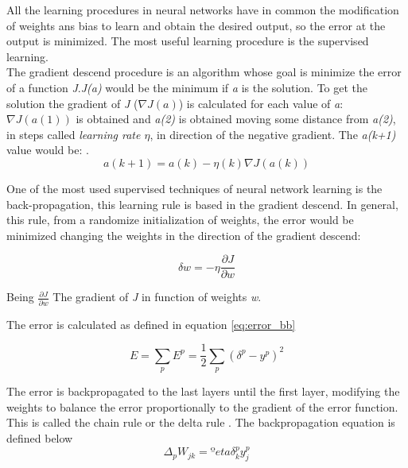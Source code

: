 All the learning procedures in neural networks have in common the modification of weights ans bias to learn and obtain the desired output, so the error at the output is minimized. The most useful learning procedure is the supervised learning.\\

The gradient descend procedure is an algorithm whose goal is minimize the error of a function \textit{J}.\textit{J(a)} would be the minimum if \textit{a} is the solution. To get the solution the gradient of \textit{J} ($\nabla J(a)$) is calculated for each value of \textit{a}: $\nabla J(a(1))$ is obtained and \textit{a(2)} is obtained moving some distance from \textit{a(2)}, in steps called \textit{learning rate $\eta$}, in direction of the negative gradient. The \textit{a(k+1)} value would be: \cite{Duda}.\\

\begin{equation}
a(k+1) = a(k) - \eta (k) \nabla J(a(k))
\end{equation}

One of the most used supervised techniques of neural network learning is the back-propagation, this learning rule is based in the gradient descend. In general, this rule, from a randomize initialization of weights, the error would be minimized changing the weights in the direction of the gradient descend:

\begin{equation}
\delta w = -\eta\frac{\partial J}{\partial w}
\end{equation}

Being $\frac{\partial J}{\partial w}$ The gradient of \textit{J} in function of weights \textit{w}.

The error is calculated as defined in equation \ref{eq:error_bb}

\begin{equation}
E=\sum_{p}E^p = \frac{1}{2}\sum_{p}(\delta^p- y^p)^2
\end{equation} \label{eq:error_bb}

The error is backpropagated to the last layers until the first layer, modifying the weights to balance the error proportionally to the gradient of the error function. This is called the chain rule or the delta rule \cite{Duda, BINN, krose}. The backpropagation equation is defined below\\

			\begin{equation}
			\Delta_{p}W_{jk}=ºeta \delta _{k}^{p}y_{j}^{p}
			\label{eq:ecuation_back1}
			\end{equation}\\

